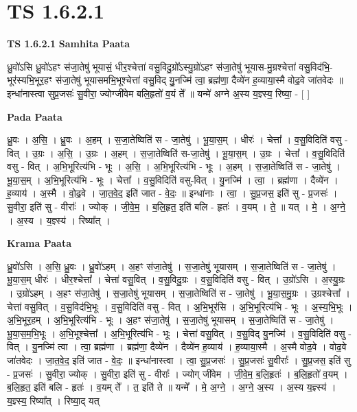 \documentclass[17pt]{extarticle}
\begin{document}
\section{ TS 1.6.2.1 }

\textbf{TS 1.6.2.1 } \newline
\textbf{Samhita Paata} \newline

ध्रु॒वो॑ऽसि ध्रु॒वो॑ऽहꣳ स॑जा॒तेषु॑ भूयासं॒ धीर॒श्चेत्ता॑ वसु॒विदु॒ग्रो᳚ऽस्यु॒ग्रो॑ऽहꣳ स॑जा॒तेषु॑ भूयास-मु॒ग्रश्चेत्ता॑ वसु॒विद॑भि॒-भूर॑स्यभि॒भूर॒हꣳ स॑जा॒तेषु॑ भूयासमभि॒भूश्चेत्ता॑ वसु॒विद् यु॒॒नज्मि॑ त्वा॒ ब्रह्म॑णा॒ दैव्ये॑न ह॒व्याया॒स्मै वोढ॒वे जा॑तवेदः ॥ इन्धा॑नास्त्वा सुप्र॒जसः॑ सु॒वीरा॒ ज्योग्जी॑वेम बलि॒हृतो॑ व॒यं ते᳚ ॥ यन्मे॑ अग्ने अ॒स्य य॒ज्ञ्स्य॒ रिष्या॒ - [ ] \newline

\textbf{Pada Paata} \newline

ध्रु॒वः । अ॒सि॒ । ध्रु॒वः । अ॒हम् । स॒जा॒तेष्विति॑ स - जा॒तेषु॑ । भू॒या॒स॒म् । धीरः॑ । चेत्ता᳚ । व॒सु॒विदिति॑ वसु - वित् । उ॒ग्रः । अ॒सि॒ । उ॒ग्रः । अ॒हम् । स॒जा॒तेष्विति॑ स-जा॒तेषु॑ । भू॒या॒स॒म् । उ॒ग्रः । चेत्ता᳚ । व॒सु॒विदिति॑ वसु - वित् । अ॒भि॒भूरित्य॑भि - भूः । अ॒सि॒ । अ॒भि॒भूरित्य॑भि - भूः । अ॒हम् । स॒जा॒तेष्विति॑ स - जा॒तेषु॑ । भू॒या॒स॒म् । अ॒भि॒भूरित्य॑भि - भूः । चेत्ता᳚ । व॒सु॒विदिति॑ वसु-वित् । यु॒नज्मि॑ । त्वा॒ । ब्रह्म॑णा । दैव्ये॑न । ह॒व्याय॑ । अ॒स्मै । वो॒ढ॒वे । जा॒त॒वे॒द॒ इति॑ जात - वे॒दः॒ ॥ इन्धा॑नाः । त्वा॒ । सु॒प्र॒जस॒ इति॑ सु - प्र॒जसः॑ । सु॒वीरा॒ इति॑ सु - वीराः᳚ । ज्योक् । जी॒वे॒म॒ । ब॒लि॒हृत॒ इति॑ बलि - हृतः॑ । व॒यम् । ते॒ ॥ यत् । मे॒ । अ॒ग्ने॒ । अ॒स्य । य॒ज्ञ्स्य॑ । रिष्या᳚त् ।  \newline


\textbf{Krama Paata} \newline

ध्रु॒वो॑ऽसि । अ॒सि॒ ध्रु॒वः । ध्रु॒वो॑ऽहम् । अ॒हꣳ स॑जा॒तेषु॑ । स॒जा॒तेषु॑ भूयासम् । स॒जा॒तेष्विति॑ स - जा॒तेषु॑ । भू॒या॒स॒म् धीरः॑ । धीर॒श्चेत्ता᳚ । चेत्ता॑ वसु॒वित् । व॒सु॒विदु॒ग्रः । व॒सु॒विदिति॑ वसु - वित् । उ॒ग्रो॑ऽसि । अ॒स्यु॒ग्रः । उ॒ग्रो॑ऽहम् । अ॒हꣳ स॑जा॒तेषु॑ । स॒जा॒तेषु॑ भूयासम् । स॒जा॒तेष्विति॑ स - जा॒तेषु॑ । भू॒या॒स॒मु॒ग्रः । उ॒ग्रश्चेत्ता᳚ । चेत्ता॑ वसु॒वित् । व॒सु॒विद॑भि॒भूः । व॒सु॒विदिति॑ वसु - वित् । अ॒भि॒भूर॑सि । अ॒भि॒भूरित्य॑भि - भूः । अ॒स्य॒भि॒भूः । अ॒भि॒भूर॒हम् । अ॒भि॒भूरित्य॑भि - भूः । अ॒हꣳ स॑जा॒तेषु॑ । स॒जा॒तेषु॑ भूयासम् । स॒जा॒तेष्विति॑ स - जा॒तेषु॑ । भू॒या॒स॒म॒भि॒भूः । अ॒भि॒भूश्चेत्ता᳚ । अ॒भि॒भूरित्य॑भि - भूः । चेत्ता॑ वसु॒वित् । व॒सु॒विद् यु॒नज्मि॑ । व॒सु॒विदिति॑ वसु - वित् । यु॒नज्मि॑ त्वा । त्वा॒ ब्रह्म॑णा । ब्रह्म॑णा॒ दैव्ये॑न । दैव्ये॑न ह॒व्याय॑ । ह॒व्याया॒स्मै । अ॒स्मै वोढ॒वे । वोढ॒वे जा॑तवेदः । जा॒त॒वे॒द॒ इति॑ जात - वे॒दः॒ ॥ इन्धा॑नास्त्वा । त्वा॒ सु॒प्र॒जसः॑ । सु॒प्र॒जसः॑ सु॒वीराः᳚ । सु॒प्र॒जस॒ इति॑ सु - प्र॒जसः॑ । सु॒वीरा॒ ज्योक् । सु॒वीरा॒ इति॑ सु - वीराः᳚ । ज्योग् जी॑वेम । जी॒वे॒म॒ ब॒लि॒हृतः॑ । ब॒लि॒हृतो॑ व॒यम् । ब॒लि॒हृत॒ इति॑ बलि - हृतः॑ । व॒यम् ते᳚ । त॒ इति॑ ते ॥ यन्मे᳚ । मे॒ अ॒ग्ने॒ । अ॒ग्ने॒ अ॒स्य । अ॒स्य य॒ज्ञ्स्य॑ । य॒ज्ञ्स्य॒ रिष्या᳚त् । रिष्या॒द् यत् \newline
\end{document}
